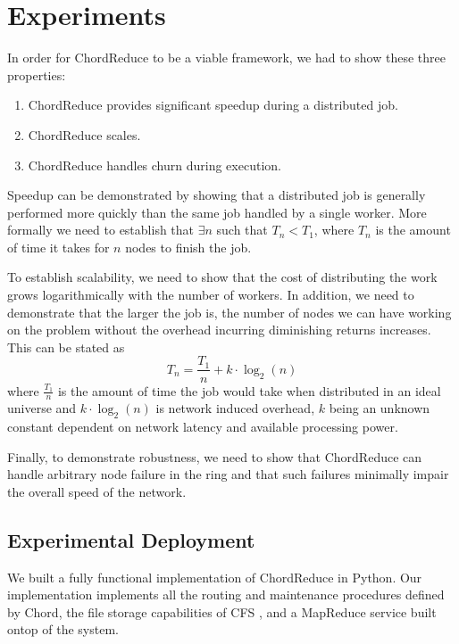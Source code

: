 


\section{Experiments}

In order for ChordReduce to be a viable framework, we had to show these three properties:
\begin{enumerate}
    \item ChordReduce provides significant speedup during a distributed job.
    \item ChordReduce scales.
    \item ChordReduce handles churn during execution.
\end{enumerate}
Speedup can be demonstrated by showing that a distributed job is generally performed more quickly than the same job handled by a single worker.  More formally we need to establish that $\exists n$ such that $T_{n} < T_{1}$, where $T_{n}$ is the amount of time it takes for $n$ nodes to finish the job.

To establish scalability, we need to show that the cost of distributing the work grows logarithmically with the number of workers.  In addition, we need to demonstrate that the larger the job is, the number of nodes we can have working on the problem without the overhead incurring diminishing returns increases. This can be stated as $$T_{n} = \frac{T_{1}}{n} + k \cdot \log_{2}(n)$$ where $\frac{T_{1}}{n}$ is the amount of time the job would take when distributed in an ideal universe and $k \cdot \log_{2}(n)$ is network induced overhead, $k$ being an unknown constant dependent on network latency and available processing power.

Finally, to demonstrate robustness, we need to show that ChordReduce can handle arbitrary node failure in the ring and that such failures minimally impair the overall speed of the network.

\subsection{Experimental Deployment}
We built a fully functional implementation of ChordReduce in Python.  Our implementation implements all the routing and maintenance procedures defined by Chord\cite{chord}, the file storage capabilities of CFS \cite{CFS}, and a MapReduce service built ontop of the system.    %

